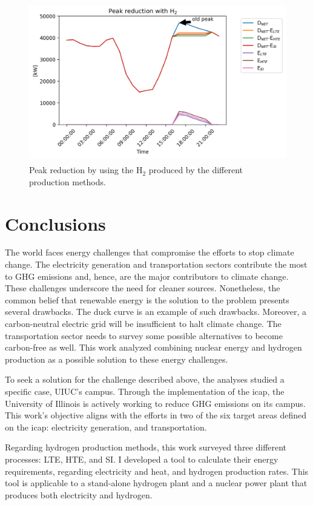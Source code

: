 \begin{figure}[htbp!]
    \centering
	\includegraphics[height=7cm]{figures-hydro/uiuc-hydro3}
	\hfill
	\caption{Peak reduction by using the H$_2$ produced by the different production methods.}
	\label{fig:uiuc-duck3}
\end{figure}

\section{Conclusions}
\label{sec:hydro-conc}

The world faces energy challenges that compromise the efforts to stop climate change.
The electricity generation and transportation sectors contribute the most to GHG emissions and, hence, are the major contributors to climate change.
These challenges underscore the need for cleaner sources.
Nonetheless, the common belief that renewable energy is the solution to the problem presents several drawbacks.
The duck curve is an example of such drawbacks.
Moreover, a carbon-neutral electric grid will be insufficient to halt climate change.
The transportation sector needs to survey some possible alternatives to become carbon-free as well.
This work analyzed combining nuclear energy and hydrogen production as a possible solution to these energy challenges.

To seek a solution for the challenge described above, the analyses studied a specific case, UIUC's campus.
Through the implementation of the \gls{icap}, the University of Illinois is actively working to reduce \gls{GHG} emissions on its campus.
This work's objective aligns with the efforts in two of the six target areas defined on the \gls{icap}: electricity generation, and transportation.

Regarding hydrogen production methods, this work surveyed three different processes: \gls{LTE}, \gls{HTE}, and \gls{SI}.
I developed a tool to calculate their energy requirements, regarding electricity and heat, and hydrogen production rates.
This tool is applicable to a stand-alone hydrogen plant and a nuclear power plant that produces both electricity and hydrogen.

